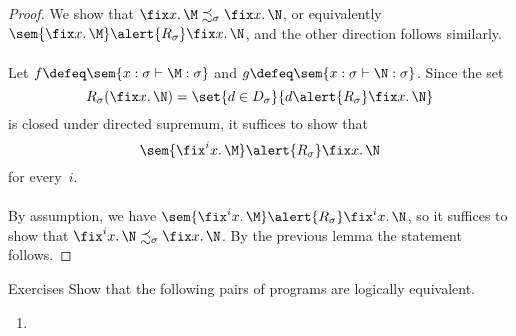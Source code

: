 \begin{frame}
  \begin{proof}
    We show that $\fix x.\, \M \precsim_\sigma \fix x.\, \N$, or
    equivalently~$\sem{\fix x.\, \M} \alert{\mathrel{R_\sigma}} \fix x.\, \N$,
    and the other direction follows similarly. 
    \\~\\
    
    Let $f \defeq \sem{x : \sigma \vdash \M : \sigma}$ and $g \defeq \sem{x :
      \sigma \vdash \N : \sigma}$. Since the set
    \[
      R_\sigma(\fix x.\,\N)
      = \set{ d \in D_\sigma}{ d \alert{\mathrel{R_\sigma}} \fix x.\,\N}
    \]
    is closed under directed supremum, it suffices to show that
    \[
      \sem{\fix^i x.\,\M} \alert{\mathrel{R_\sigma}} \fix x.\,\N
    \]
    for every~$i$.
    \\~\\
    
    By assumption, we have $\sem{\fix^i x.\,\M}\alert{\mathrel{R_\sigma}}
    \fix^i x.\,\N$, so it suffices to show that $\fix^i x.\,\N \precsim_\sigma
    \fix x.\,\N$. By the previous lemma the statement follows. 
  \end{proof}
\end{frame}

\begin{frame}{Exercises}
  Show that the following pairs of programs are logically equivalent.
  \begin{enumerate}
    \item 
  \end{enumerate}
\end{frame}

